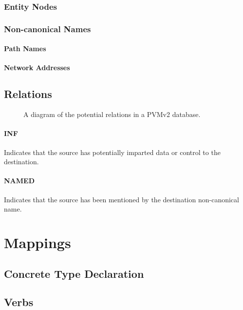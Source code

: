 \documentclass[12pt,twoside,a4paper]{article}
\begin{document}
\subsubsection{Entity Nodes}

\subsubsection{Non-canonical Names}

\paragraph{Path Names}

\paragraph{Network Addresses}

\subsection{Relations}

\begin{figure}[h]
\centering

\caption{A diagram of the potential relations in a PVMv2 database.}
\end{figure}

\paragraph{INF}
Indicates that the source has potentially imparted data or control to the destination.

\paragraph{NAMED}
Indicates that the source has been mentioned by the destination non-canonical name.

\section{Mappings}

\subsection{Concrete Type Declaration}

\subsection{Verbs}
\end{document}
